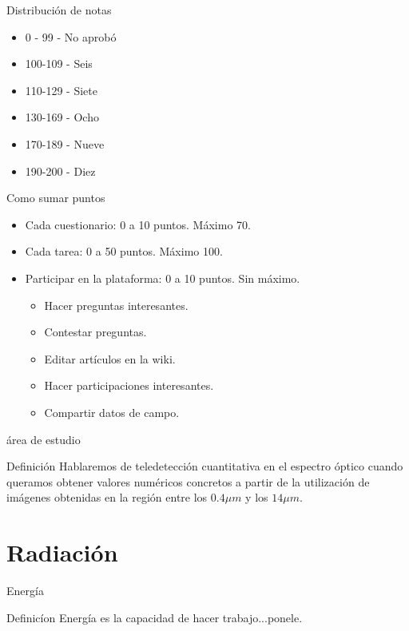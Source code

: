 \documentclass[handout,draft]{beamer}
\begin{document}
\begin{frame}{Distribución de notas}
  \begin{itemize}
    \item 0 - 99 - No aprobó
    \item 100-109 - Seis
    \item 110-129 - Siete
    \item 130-169 - Ocho
    \item 170-189 - Nueve
    \item 190-200 - Diez
  \end{itemize}
\end{frame}

\begin{frame}{Como sumar puntos}
  \begin{itemize}[<+>]
    \item Cada cuestionario: 0 a 10 puntos. Máximo 70.
    \item Cada tarea: 0 a 50 puntos. Máximo 100.
    \item Participar en la plataforma: 0 a 10 puntos. Sin máximo.
    \begin{itemize}
      \item Hacer preguntas interesantes.
      \item Contestar preguntas.
      \item Editar artículos en la wiki.
      \item Hacer participaciones interesantes.
      \item Compartir datos de campo.
    \end{itemize}
  \end{itemize}
\end{frame}

\begin{frame}{área de estudio}
  \begin{block}{Definición}
    Hablaremos de teledetección cuantitativa en el espectro óptico cuando queramos obtener valores numéricos concretos a partir de la utilización de imágenes obtenidas en la región entre los $0.4\mu m$ y los $14\mu m$.
  \end{block}
\end{frame}

\section{Radiación}
\label{sec:radiacion}
\begin{frame}{Energía}
  \begin{block}{Definicíon}
    Energía es la capacidad de hacer trabajo...\pause ponele.
  \end{block}
\end{frame}
\end{document}
